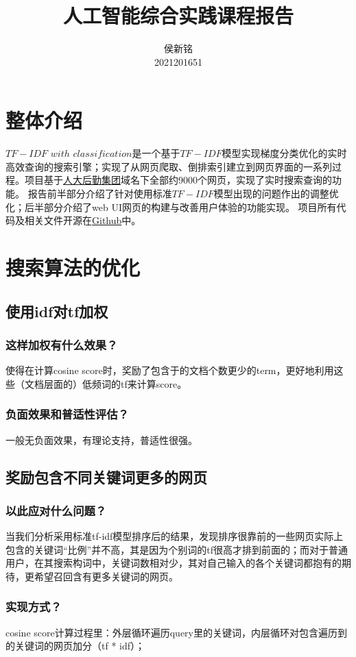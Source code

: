 \documentclass{ctexart}
\title{人工智能综合实践课程报告}
\author{侯新铭 \\ 2021201651}
\begin{document}
\maketitle

\section{整体介绍}
$TF-IDF$ $with$ $classification$是一个基于$TF-IDF$模型实现梯度分类优化的实时高效查询的搜索引擎；实现了从网页爬取、倒排索引建立到网页界面的一系列过程。项目基于\href{http://hqjt.ruc.edu.cn/}{人大后勤集团}域名下全部约9000个网页，实现了实时搜索查询的功能。
报告前半部分介绍了针对使用标准$TF-IDF$模型出现的问题作出的调整优化；后半部分介绍了web UI网页的构建与改善用户体验的功能实现。
项目所有代码及相关文件开源在\href{https://github.com/ShermanHou/Search_Engine}{Github}中。
\section{搜索算法的优化}
\subsection{使用idf对tf加权} 
\subsubsection{这样加权有什么效果？}
使得在计算cosine score时，奖励了包含于的文档个数更少的term，更好地利用这些（文档层面的）低频词的tf来计算score。
\subsubsection{负面效果和普适性评估？}
一般无负面效果，有理论支持，普适性很强。
\subsection{奖励包含不同关键词更多的网页} 
\subsubsection{以此应对什么问题？}
当我们分析采用标准tf-idf模型排序后的结果，发现排序很靠前的一些网页实际上包含的关键词“比例”并不高，其是因为个别词的tf很高才排到前面的；而对于普通用户，在其搜索构词中，关键词数相对少，其对自己输入的各个关键词都抱有的期待，更希望召回含有更多关键词的网页。
\subsubsection{实现方式？}
cosine score计算过程里：外层循环遍历query里的关键词，内层循环对包含遍历到的关键词的网页加分（tf * idf）；
\end{document}
